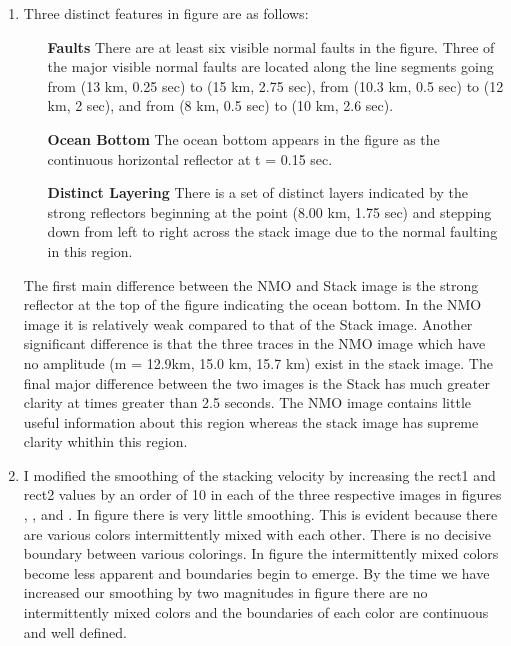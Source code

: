 \begin{enumerate}

  \item Three distinct features in figure  are as follows:
  \begin{itemize}
    \item[\textbf{Faults}] There are at least six visible normal faults in the figure. Three of the major visible normal faults are located along the line segments going from (13 km, 0.25 sec) to (15 km, 2.75 sec), from (10.3 km, 0.5 sec) to (12 km, 2 sec), and from (8 km, 0.5 sec) to (10 km, 2.6 sec).
    \item[\textbf{Ocean Bottom}] The ocean bottom appears in the figure as the continuous horizontal reflector at t = 0.15 sec.
    \item[\textbf{Distinct Layering}] There is a set of distinct layers indicated by the strong reflectors beginning at the point (8.00 km, 1.75 sec) and stepping down from left to right across the stack image due to the normal faulting in this region. 
  \end{itemize}  The first main difference between the NMO and Stack image is the strong reflector at the top of the figure indicating the ocean bottom. In the NMO image it is relatively weak compared to that of the Stack image. Another significant difference is that the three traces in the NMO image which have no amplitude (m = 12.9km, 15.0 km, 15.7 km) exist in the stack image. The final major difference between the two images is the Stack has much greater clarity at times greater than 2.5 seconds. The NMO image contains little useful information about this region whereas the stack image has supreme clarity whithin this region.



  \item I modified the smoothing of the stacking velocity by increasing the rect1 and rect2 values by an order of 10 in each of the three respective images in figures , , and . In figure  there is very little smoothing. This is evident because there are various colors intermittently mixed with each other. There is no decisive boundary between various colorings. In figure  the intermittently mixed colors become less apparent and boundaries begin to emerge. By the time we have increased our smoothing by two magnitudes in figure  there are no intermittently mixed colors and the boundaries of each color are continuous and well defined.

\end{enumerate}